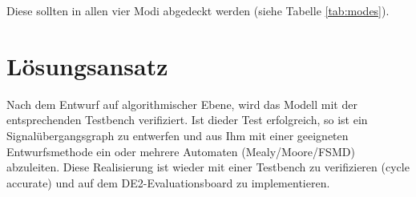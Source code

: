 Diese sollten in allen vier Modi abgedeckt werden (siehe Tabelle \ref{tab:modes}).

\section{Lösungsansatz}
Nach dem Entwurf auf algorithmischer Ebene, wird das Modell mit der entsprechenden Testbench
verifiziert. Ist dieder Test erfolgreich, so ist ein Signalübergangsgraph zu entwerfen und aus Ihm
mit einer geeigneten Entwurfsmethode ein oder mehrere Automaten (Mealy/Moore/FSMD) abzuleiten.
Diese Realisierung ist wieder mit einer Testbench zu verifizieren (cycle accurate) und auf dem
DE2-Evaluationsboard zu implementieren.
